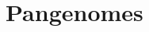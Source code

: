 \documentclass[a4paper,12pt,numbered,oneside]{Classes/PhDThesisPSnPDF}
\begin{document}



\section{Pangenomes}
\label{sec:pangenomes}
\end{document}

